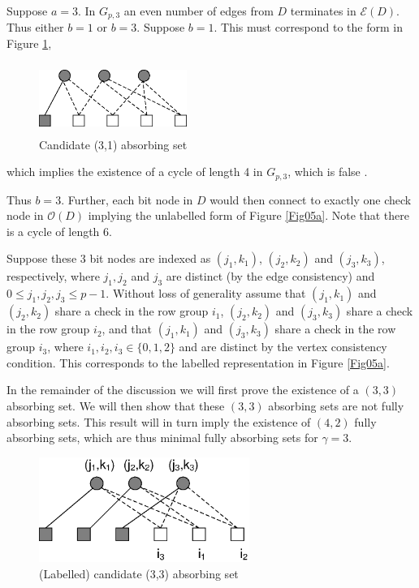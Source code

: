 Suppose $a=3$. In $G_{p,3}$ an even number of edges from $D$
terminates in $\mathcal{E}(D)$. Thus either $b=1$ or $b=3$.
Suppose $b=1$. This must correspond to the form in Figure
\ref{Fig06},
\begin{figure}
\center\includegraphics[width=1.9in,height=0.9in]{fig06a.eps}
\caption{Candidate (3,1) absorbing set}\label{Fig06}
\end{figure}
which implies the existence of a cycle of length 4 in $G_{p,3}$,
which is false \cite{fan}.

Thus $b=3$. Further, each bit node in $D$ would then connect to
exactly one check node in $\mathcal{O}(D)$ implying the unlabelled
form of Figure \ref{Fig05a}.
Note that there is a cycle of length 6.

Suppose these $3$ bit nodes are indexed as $(j_1,k_1)$,
$(j_2,k_2)$ and $(j_3,k_3)$, respectively, where $j_1,j_2$ and
$j_3$ are distinct (by the edge consistency) and $0 \leq j_1, j_2,
j_3 \leq p-1$. Without loss of generality assume that $(j_1,k_1)$
and $(j_2,k_2)$ share a check in the row group $i_1$, $(j_2,k_2)$
and $(j_3,k_3)$ share a check in the row group $i_2$, and that
$(j_1,k_1)$ and $(j_3,k_3)$ share a check in the row group $i_3$,
where $i_1,i_2,i_3 \in \{0,1,2\}$ and are distinct by the vertex
consistency condition. This corresponds to the labelled
representation in Figure \ref{Fig05a}.

In the remainder of the discussion we will first prove the
existence of a $(3,3)$ absorbing set. We will then show that these
$(3,3)$ absorbing sets are not fully absorbing sets. This result
will in turn imply the existence of $(4,2)$ fully absorbing sets,
which are thus minimal fully absorbing sets for $\gamma=3$.

\begin{figure}
\center\includegraphics[width=2.7in,height=1.35in]{fig05a.ps}
\caption{(Labelled) candidate (3,3) absorbing set}\label{Fig05}
\end{figure}


